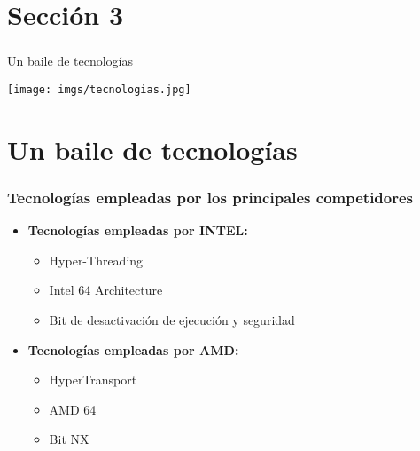 \section*{Sección 3}
\frame
{
\frametitle{}
\begin{center}
\begin{huge}
\hspace*{1cm}Un baile de tecnologías\newline\newline
\end{huge}
\texttt{[image: imgs/tecnologias.jpg]}
\end{center}
}

\section{Un baile de tecnologías}
\frame
{
\frametitle{Tecnologías empleadas por los principales competidores}

\begin{itemize}
 \item \textbf{Tecnologías empleadas por INTEL:}

	\begin{itemize}
	 \item Hyper-Threading
	 \item Intel 64 Architecture
	 \item Bit de desactivación de ejecución y seguridad
	\end{itemize}

\item \textbf{Tecnologías empleadas por AMD:}

	\begin{itemize}
	 \item HyperTransport
	 \item AMD 64
	 \item Bit NX
	\end{itemize}

\end{itemize}
}

